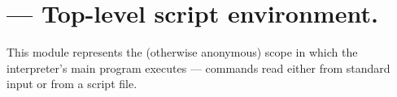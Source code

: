 \section{ ---
         Top-level script environment.}


This module represents the (otherwise anonymous) scope in which the
interpreter's main program executes --- commands read either from
standard input or from a script file.
